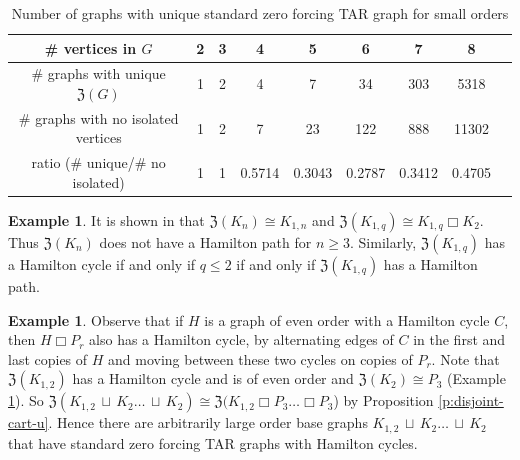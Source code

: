 \documentclass{article}
\numberwithin{figure}{section}
\numberwithin{table}{section}
\numberwithin{equation}{section}
\theoremstyle{definition}
\theoremstyle{definition}
\theoremstyle{definition}
\newtheorem{ex}[thm]{Example}
\newcommand {\du} {\,\sqcup\,}
\newcommand{\ztar}{\mathfrak{Z}}%
\begin{document}
{\begin{table}[!h]
\begin{center}
\begin{tabular}{ |c|c|c|c|c|c|c|c|c| } 
 \hline
\#  vertices in $G$  & 2 & 3 & 4 & 5 & 6 & 7 
 & 8\\
\hline
\# graphs with  unique $\ztar(G)$  & 1 & 2 & 4 & 7 & 34 & 303 & 5318\\
  \hline
\# graphs with no isolated vertices  & 1 & 2 & 7 & 23 & 122 & 888 & 11302\\
 \hline
 ratio (\# unique/\# no isolated) &  1 & 1 & 0.5714 & 0.3043 & 0.2787 & 0.3412  %
& 0.4705\\
 \hline
\end{tabular}\vspace{-9pt}
\end{center}
    \caption{\cite[Table 1]{XTARiso} Number of graphs with unique standard zero forcing TAR graph for small orders}
    \label{tab:unique-tar-data=Z}
\end{table}%


\begin{ex} \label{ex:HamZsmall}
It is shown in \cite{XTARiso} that $\ztar(K_n)\cong K_{1,n}$ and $\ztar(K_{1,q})\cong K_{1,q}\Box K_2$.  Thus $\ztar(K_n)$ does not have a Hamilton path for $n\ge 3$.  Similarly, $\ztar(K_{1,q})$  has a Hamilton cycle if and only if $q\le 2$ if and only if $\ztar(K_{1,q})$ has a Hamilton path. 
\end{ex}

\begin{ex}\label{ex:bigHam}
    Observe that if $H$ is a graph of even order with a Hamilton cycle $C$, then $H\Box P_r$ also has a Hamilton cycle, by alternating edges of $C$ in the first and last copies of $H$ and moving between these two cycles on copies of $P_r$.  Note that $\ztar(K_{1,2})$ has a Hamilton cycle and is of even order and $\ztar(K_2)\cong P_3$ (Example \ref{ex:HamZsmall}).  So  $\ztar(K_{1,2}\du K_2\dots \du K_2)\cong \ztar(K_{1,2}\Box P_3\dots\Box P_3$) by Proposition \ref{p:disjoint- cart-u}.  Hence there are arbitrarily large order base graphs $K_{1,2}\du K_2\dots \du K_2$ that have standard zero forcing TAR graphs with Hamilton cycles. 
\end{ex}

}
\end{document}
